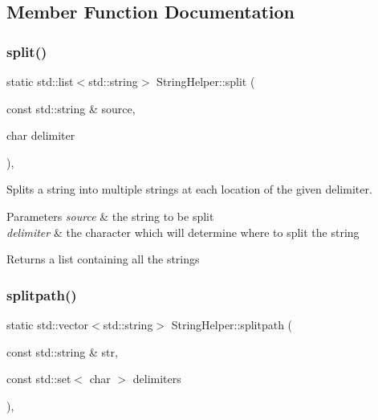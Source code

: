 \subsection{Member Function Documentation}
\hypertarget{class_string_helper_a03cb28b0b0ced4aca4ccac59bdd74625}{}\label{class_string_helper_a03cb28b0b0ced4aca4ccac59bdd74625} 
\subsubsection{\texorpdfstring{split()}{split()}}
{\footnotesize\ttfamily static std\+::list$<$std\+::string$>$ String\+Helper\+::split (\begin{DoxyParamCaption}\item[{const std\+::string \&}]{source,  }\item[{char}]{delimiter }\end{DoxyParamCaption})\hspace{0.3cm}{\ttfamily [inline]}, {\ttfamily [static]}}

Splits a string into multiple strings at each location of the given delimiter. 
\begin{DoxyParams}{Parameters}
{\em source} & the string to be split \\
\hline
{\em delimiter} & the character which will determine where to split the string \\
\hline
\end{DoxyParams}
\begin{DoxyReturn}{Returns}
a list containing all the strings 
\end{DoxyReturn}
\hypertarget{class_string_helper_a783526b9f8fd876bddefd767537f49cf}{}\label{class_string_helper_a783526b9f8fd876bddefd767537f49cf} 
\subsubsection{\texorpdfstring{splitpath()}{splitpath()}}
{\footnotesize\ttfamily static std\+::vector$<$std\+::string$>$ String\+Helper\+::splitpath (\begin{DoxyParamCaption}\item[{const std\+::string \&}]{str,  }\item[{const std\+::set$<$ char $>$}]{delimiters }\end{DoxyParamCaption})\hspace{0.3cm}{\ttfamily [inline]}, {\ttfamily [static]}}

